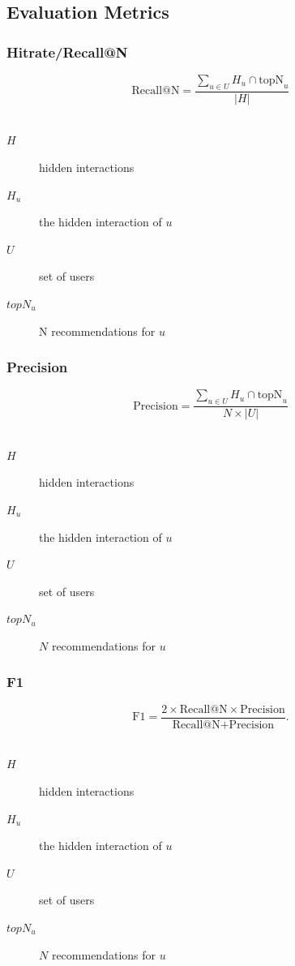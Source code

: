 \documentclass{beamer}
\begin{document}
\subsection{Evaluation Metrics}
\begin{frame} 
\frametitle{Hitrate/Recall@N~\cite{Karypis:2001:EIT:502585.502627, Sarwar00applicationof}}
\begin{equation} 
\text{Recall@N}=\frac{\sum_{u \in U} H_u \cap \text{topN}_u}{|H|}
\end{equation}\\
\vspace{6.4mm}
\begin{description}
    \item[$H$] hidden interactions\\
    \item[$H_u$] the hidden interaction of $u$\\
    \item[$U$] set of users
    \item[$topN_u$] N recommendations for $u$
\end{description}
\end{frame}

\begin{frame} 
\frametitle{Precision~\cite{Sarwar00applicationof}}
\begin{equation} 
\text{Precision}=\frac{\sum_{u \in U} H_u \cap \text{topN}_u}{N \times |U|}
\end{equation}\\
\vspace{6.4mm}
\begin{description}
    \item[$H$] hidden interactions\\
    \item[$H_u$] the hidden interaction of $u$\\
    \item[$U$] set of users
    \item[$topN_u$] $N$ recommendations for $u$
\end{description}
\end{frame}

\begin{frame} 
    \frametitle{F1~\cite{Sarwar00applicationof}}
\begin{equation} 
\text{F1}=\frac{2 \times \text{Recall@N} \times 
\text{Precision}}{\text{Recall@N} + \text{Precision}}.
\end{equation}\\
\vspace{6.4mm}
\begin{description}
    \item[$H$] hidden interactions\\
    \item[$H_u$] the hidden interaction of $u$\\
    \item[$U$] set of users
    \item[$topN_u$] $N$ recommendations for $u$
\end{description}
\end{frame}
\end{document}
